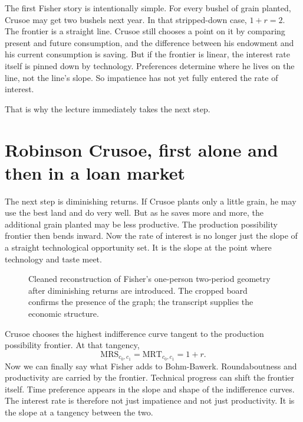 The first Fisher story is intentionally simple. For every bushel of grain planted, Crusoe may get two bushels next year. In that stripped-down case, \(1+r=2\). The frontier is a straight line. Crusoe still chooses a point on it by comparing present and future consumption, and the difference between his endowment and his current consumption is saving. But if the frontier is linear, the interest rate itself is pinned down by technology. Preferences determine where he lives on the line, not the line's slope. So impatience has not yet fully entered the rate of interest.

That is why the lecture immediately takes the next step.

\section{Robinson Crusoe, first alone and then in a loan market}

The next step is diminishing returns. If Crusoe plants only a little grain, he may use the best land and do very well. But as he saves more and more, the additional grain planted may be less productive. The production possibility frontier then bends inward. Now the rate of interest is no longer just the slope of a straight technological opportunity set. It is the slope at the point where technology and taste meet.

\begin{figure}[t]
\centering
{}
\caption{Cleaned reconstruction of Fisher's one-person two-period geometry after diminishing returns are introduced. The cropped board confirms the presence of the graph; the transcript supplies the economic structure.}
\end{figure}

Crusoe chooses the highest indifference curve tangent to the production possibility frontier. At that tangency,
\begin{equation}
\mathrm{MRS}_{c_0,c_1}=\mathrm{MRT}_{c_0,c_1}=1+r.
\end{equation}
Now we can finally say what Fisher adds to Bohm-Bawerk. Roundaboutness and productivity are carried by the frontier. Technical progress can shift the frontier itself. Time preference appears in the slope and shape of the indifference curves. The interest rate is therefore not just impatience and not just productivity. It is the slope at a tangency between the two.

